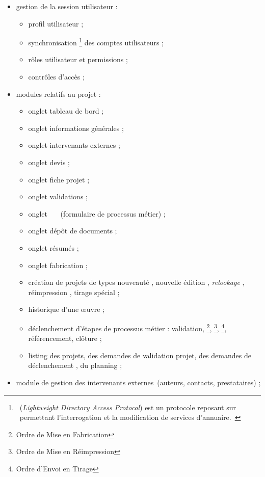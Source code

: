 \begin{itemize}
	\item gestion de la session utilisateur :
    	\begin{itemize}
			\item profil utilisateur ;
			\item synchronisation \aldap\footnote{\aldap\ (\textit{Lightweight Directory Access Protocol}) est un protocole reposant sur \atcpip\ permettant l'interrogation et la modification de services d'annuaire.~\cite{ldap}} des comptes utilisateurs ;
			\item rôles utilisateur et permissions ;
			\item contrôles d'accès ;
		\end{itemize}
    \item modules relatifs au projet :
    	\begin{itemize}
			\item onglet \og tableau de bord \fg ;
			\item onglet \og informations générales \fg ;
			\item onglet \og intervenants externes \fg ;
			\item onglet \og devis \fg ;
			\item onglet \og fiche projet \fg ;
			\item onglet \og validations \fg ;
			\item onglet \og \abat\ \aef\ \fg\aast\ (formulaire de processus métier) ;
			\item onglet \og dépôt de documents \fg ;
			\item onglet \og résumés \fg ;
			\item onglet \og fabrication \fg ;
			\item création de projets de types \og nouveauté \fg, \og nouvelle édition \fg, \og \textit{relookage} \fg, \og réimpression \fg, \og tirage spécial \fg\aast ;
			\item historique d'une œuvre ;
			\item déclenchement d'étapes de processus métier : validation, \aomf\footnote{Ordre de Mise en Fabrication}, \aomr\footnote{Ordre de Mise en Réimpression}, \aoet\footnote{Ordre d'Envoi en Tirage}, référencement\aast, clôture ;
			\item listing des projets\aast, des demandes de validation projet\aast, des demandes de déclenchement \aoet\aast, du planning \aef\aast ;
		\end{itemize}
	\item module de gestion des intervenants externes\aast\ (auteurs, contacts, prestataires) ;

\end{itemize}
